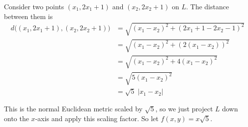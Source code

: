 \documentclass[a4paper]{article}
\begin{document}

Consider two points $(x_1, 2 x_1 + 1)$ and $(x_2, 2 x_2 + 1)$ on $L$. The distance between them is \begin{align*}
d\big( (x_1, 2 x_1 + 1), (x_2, 2 x_2 + 1) \big) &= \sqrt{{(x_1 - x_2)}^2 + {(2 x_1 + 1 - 2 x_2 - 1)}^2} \\
&= \sqrt{{(x_1 - x_2)}^2 + {(2 (x_1 - x_2))}^2} \\
&= \sqrt{{(x_1 - x_2)}^2 + 4 {(x_1 - x_2)}^2} \\
&= \sqrt{5 {(x_1 - x_2)}^2} \\
&= \sqrt5\; |x_1 - x_2|
\end{align*}

This is the normal Euclidean metric scaled by $\sqrt5$, so we just project $L$ down onto the $x$-axis and apply this scaling factor. So let $f(x, y) = x \sqrt5$.

\end{document}
